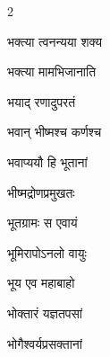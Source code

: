 \begin{multicols}{2}
\begin{indexlist}
\item भक्त्या त्वनन्यया शक्य \dotfill {}
\item भक्त्या मामभिजानाति \dotfill {}
\item भयाद् रणादुपरतं \dotfill {}
\item भवान् भीष्मश्च कर्णश्च \dotfill {}
\item भवाप्ययौ हि भूतानां \dotfill {}
\item भीष्मद्रोणप्रमुखतः \dotfill {}
\item भूतग्रामः स एवायं \dotfill {}
\item भूमिरापोऽनलो वायुः \dotfill {}
\item भूय एव महाबाहो \dotfill {}
\item भोक्तारं यज्ञतपसां \dotfill {}
\item भोगैश्वर्यप्रसक्तानां \dotfill {}
\end{indexlist}


\end{multicols}
